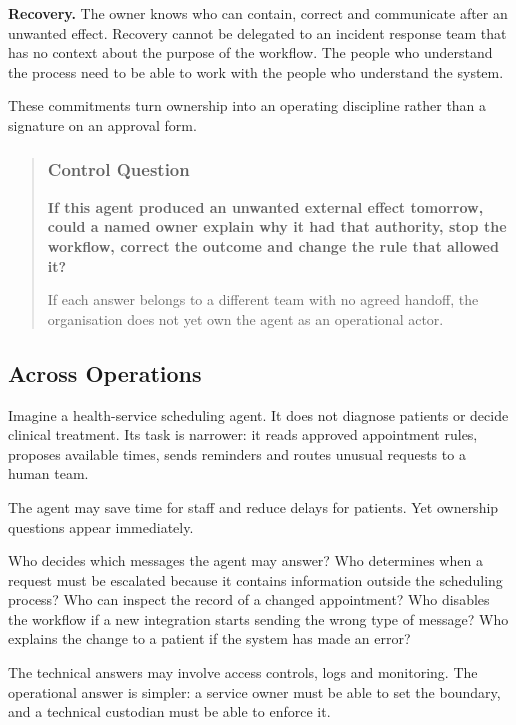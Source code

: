\textbf{Recovery.} The owner knows who can contain, correct and
communicate after an unwanted effect. Recovery cannot be delegated to an
incident response team that has no context about the purpose of the
workflow. The people who understand the process need to be able to work
with the people who understand the system.

These commitments turn ownership into an operating discipline rather
than a signature on an approval form.

\begin{quote}
\subsubsection{Control Question}\label{control-question}

\textbf{If this agent produced an unwanted external effect tomorrow,
could a named owner explain why it had that authority, stop the
workflow, correct the outcome and change the rule that allowed it?}

If each answer belongs to a different team with no agreed handoff, the
organisation does not yet own the agent as an operational actor.
\end{quote}

\subsection{Across Operations}\label{across-operations}

Imagine a health-service scheduling agent. It does not diagnose patients
or decide clinical treatment. Its task is narrower: it reads approved
appointment rules, proposes available times, sends reminders and routes
unusual requests to a human team.

The agent may save time for staff and reduce delays for patients. Yet
ownership questions appear immediately.

Who decides which messages the agent may answer? Who determines when a
request must be escalated because it contains information outside the
scheduling process? Who can inspect the record of a changed appointment?
Who disables the workflow if a new integration starts sending the wrong
type of message? Who explains the change to a patient if the system has
made an error?

The technical answers may involve access controls, logs and monitoring.
The operational answer is simpler: a service owner must be able to set
the boundary, and a technical custodian must be able to enforce it.

